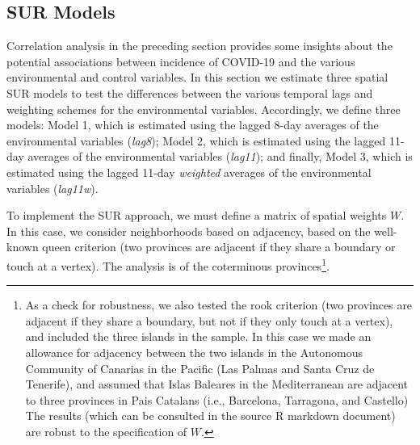 \documentclass[]{elsarticle} %
\begin{document}
\hypertarget{sur-models}{%
\subsection{SUR Models}\label{sur-models}}

Correlation analysis in the preceding section provides some insights
about the potential associations between incidence of COVID-19 and the
various environmental and control variables. In this section we estimate
three spatial SUR models to test the differences between the various
temporal lags and weighting schemes for the environmental variables.
Accordingly, we define three models: Model 1, which is estimated using
the lagged 8-day averages of the environmental variables (\emph{lag8});
Model 2, which is estimated using the lagged 11-day averages of the
environmental variables (\emph{lag11}); and finally, Model 3, which is
estimated using the lagged 11-day \emph{weighted} averages of the
environmental variables (\emph{lag11w}).

To implement the SUR approach, we must define a matrix of spatial
weights \(W\). In this case, we consider neighborhoods based on
adjacency, based on the well-known queen criterion (two provinces are
adjacent if they share a boundary or touch at a vertex). The analysis is
of the coterminous
provinces\footnote{As a check for robustness, we also tested the rook criterion (two provinces are adjacent if they share a boundary, but not if they only touch at a vertex), and included the three islands in the sample. In this case we made an allowance for adjacency between the two islands in the Autonomous Community of Canarias in the Pacific (Las Palmas and Santa Cruz de Tenerife), and assumed that Islas Baleares in the Mediterranean are adjacent to three provinces in Pais Catalans (i.e., Barcelona, Tarragona, and Castello) The results (which can be consulted in the source R markdown document) are robust to the specification of $W$.}.
\end{document}
